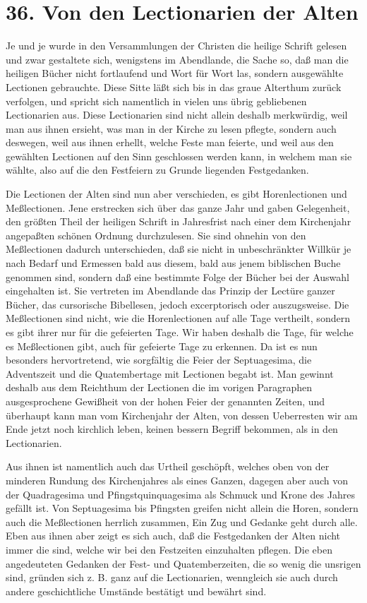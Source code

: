 \section{36. Von den Lectionarien der Alten}

Je und je wurde in den Versammlungen der Christen die heilige Schrift gelesen und zwar gestaltete sich, wenigstens im Abendlande, die Sache so, daß man die heiligen Bücher nicht fortlaufend und Wort für Wort las, sondern ausgewählte Lectionen gebrauchte. Diese Sitte läßt sich bis in das graue Alterthum zurück verfolgen, und spricht sich namentlich in vielen uns übrig gebliebenen Lectionarien aus. Diese Lectionarien sind nicht allein deshalb merkwürdig, weil man aus ihnen ersieht, was man in der Kirche zu lesen pflegte, sondern auch deswegen, weil aus ihnen erhellt, welche Feste man feierte, und weil aus den gewählten Lectionen auf den Sinn geschlossen werden kann, in welchem man sie wählte, also auf die den Festfeiern zu Grunde liegenden Festgedanken.

Die Lectionen der Alten sind nun aber verschieden, es gibt Horenlectionen und Meßlectionen. Jene erstrecken sich über das ganze Jahr und gaben Gelegenheit, den größten Theil der heiligen Schrift in Jahresfrist nach einer dem Kirchenjahr angepaßten schönen Ordnung durchzulesen. Sie sind ohnehin von den Meßlectionen dadurch unterschieden, daß sie nicht in unbeschränkter Willkür je nach Bedarf und Ermessen bald aus diesem, bald aus jenem biblischen Buche genommen sind, sondern daß eine bestimmte Folge der Bücher bei der Auswahl eingehalten ist. Sie vertreten im Abendlande das Prinzip der Lectüre ganzer Bücher, das cursorische Bibellesen, jedoch excerptorisch oder auszugsweise. Die Meßlectionen sind
nicht, wie die Horenlectionen auf alle Tage vertheilt, sondern es gibt ihrer nur für die gefeierten Tage. Wir haben deshalb die Tage, für welche es Meßlectionen gibt, auch für gefeierte Tage zu erkennen. Da ist es nun besonders hervortretend, wie sorgfältig die Feier der Septuagesima, die Adventszeit und die Quatembertage mit Lectionen begabt ist. Man gewinnt deshalb aus dem Reichthum der Lectionen die im vorigen Paragraphen ausgesprochene Gewißheit von der hohen Feier der genannten Zeiten, und überhaupt kann man vom Kirchenjahr der Alten, von dessen Ueberresten wir am Ende jetzt noch kirchlich leben, keinen bessern Begriff bekommen, als in den Lectionarien.

Aus ihnen ist namentlich auch das Urtheil geschöpft, welches oben von der minderen Rundung des Kirchenjahres als eines Ganzen, dagegen aber auch von der Quadragesima und Pfingstquinquagesima als Schmuck und Krone des Jahres gefällt ist. Von Septuagesima bis Pfingsten greifen nicht allein die Horen, sondern auch die Meßlectionen herrlich zusammen, Ein Zug und Gedanke geht durch alle. Eben aus ihnen aber zeigt es sich auch, daß die Festgedanken der Alten nicht immer die sind, welche wir bei den Festzeiten einzuhalten pflegen. Die eben angedeuteten Gedanken der Fest- und Quatemberzeiten, die so wenig die unsrigen sind, gründen sich z. B. ganz auf die Lectionarien, wenngleich sie auch durch andere geschichtliche Umstände bestätigt und bewährt sind.

